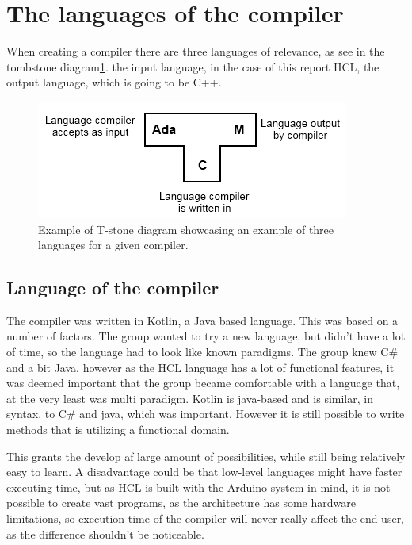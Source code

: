 \section{The languages of the compiler}
When creating a compiler there are three languages of relevance, as see in the tombstone diagram\ref{fig:TStoneExample}.
the input language, in the case of this report HCL, the output language, which is going to be C++. 

\begin{figure}[H]
	\centering
	\includegraphics[width=\textwidth/2+\textwidth/4]{4.Solution/images/T-diagram.png}
	\caption{
		Example of T-stone diagram showcasing an example of three languages for a given compiler.\cite{TStoneWiki}
	}
	\label{fig:TStoneExample}
\end{figure}
\subsection{Language of the compiler}
The compiler was written in Kotlin\cite{KotlinWebsite}, a Java based language.
This was based on a number of factors.
The group wanted to try a new language, but didn't have a lot of time, so the language had to look like known paradigms. 
The group knew C\# and a bit Java, however as the HCL language has a lot of functional features, it was deemed important that the group became comfortable with a language that, at the very least was multi paradigm.
Kotlin is java-based and is similar, in syntax, to C\# and java, which was important.
However it is still possible to write methods that is utilizing a functional domain.

This grants the develop af large amount of possibilities, while still being relatively easy to learn.
A disadvantage could be that low-level languages might have faster executing time, but as HCL is built with the Arduino system in mind, it is not possible to create vast programs, as the architecture has some hardware limitations, so execution time of the compiler will never really affect the end user, as the difference shouldn't be noticeable.

